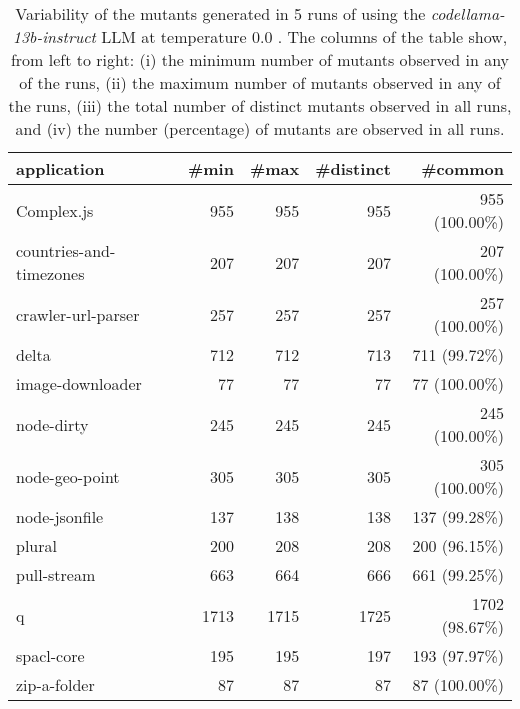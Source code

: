 
\begin{table}[hbt!]
\centering
{\footnotesize
\begin{tabular}{l|r|r|r|r}

{\bf application}  & {\bf \#min} &  {\bf \#max} &  {\bf \#distinct} & {\bf \#common}\\
\hline
Complex.js & 955 & 955 & 955 & 955 (100.00\%) \\ 
countries-and-timezones & 207 & 207 & 207 & 207 (100.00\%) \\ 
crawler-url-parser & 257 & 257 & 257 & 257 (100.00\%) \\ 
delta & 712 & 712 & 713 & 711 (99.72\%) \\ 
image-downloader & 77 & 77 & 77 & 77 (100.00\%) \\ 
node-dirty & 245 & 245 & 245 & 245 (100.00\%) \\ 
node-geo-point & 305 & 305 & 305 & 305 (100.00\%) \\ 
node-jsonfile & 137 & 138 & 138 & 137 (99.28\%) \\ 
plural & 200 & 208 & 208 & 200 (96.15\%) \\ 
pull-stream & 663 & 664 & 666 & 661 (99.25\%) \\ 
q & 1713 & 1715 & 1725 & 1702 (98.67\%) \\ 
spacl-core & 195 & 195 & 197 & 193 (97.97\%) \\ 
zip-a-folder & 87 & 87 & 87 & 87 (100.00\%) \\ 
\end{tabular}
}
\caption{
  Variability of the mutants generated in 5 runs of \ToolName using the \textit{codellama-13b-instruct} LLM
       at temperature 0.0 . The columns of the table show, from left to right:
    (i) the minimum number of mutants observed in any of the runs,
    (ii) the maximum number of mutants observed in any of the runs,
    (iii) the total number of distinct mutants observed in all runs, and
    (iv) the number (percentage) of mutants are observed in all runs.
}
\label{table:Variability_codellama-13b-instruct_0.0}
\end{table}